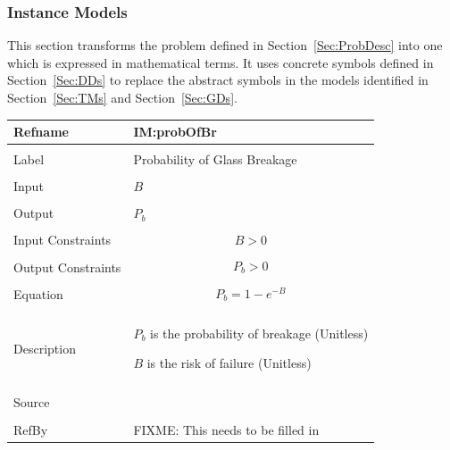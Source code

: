 \documentclass[12pt]{article}
\begin{document}
\subsubsection{Instance Models}
\label{Sec:IMs}
This section transforms the problem defined in Section~\ref{Sec:ProbDesc} into one which is expressed in mathematical terms. It uses concrete symbols defined in Section~\ref{Sec:DDs} to replace the abstract symbols in the models identified in Section~\ref{Sec:TMs} and Section~\ref{Sec:GDs}.
~\newline
\noindent \begin{minipage}{\textwidth}
\begin{tabular}{p{} p{}}
\toprule \textbf{Refname} & \textbf{IM:probOfBr}
\label{IM:probOfBr}
\\ \midrule \\
Label & Probability of Glass Breakage
\\ \midrule \\
Input & $B$
\\ \midrule \\
Output & ${P_{b}}$
\\ \midrule \\
Input Constraints & \begin{dmath}
                    B>0
                    \end{dmath}
\\ \midrule \\
Output Constraints & \begin{dmath}
                     {P_{b}}>0
                     \end{dmath}
\\ \midrule \\
Equation & \begin{dmath}
           {P_{b}}=1-e^{-B}
           \end{dmath}
\\ \midrule \\
Description & \begin{description}
              \item{${P_{b}}$ is the probability of breakage (Unitless)}
              \item{$B$ is the risk of failure (Unitless)}
              \end{description}
\\ \midrule \\
Source & 
\\ \midrule \\
RefBy & FIXME: This needs to be filled in
\\ \bottomrule \end{tabular}
\end{minipage}\\
\end{document}
